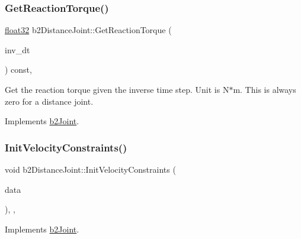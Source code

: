 \subsubsection{\texorpdfstring{GetReactionTorque()}{GetReactionTorque()}}
{\footnotesize\ttfamily \mbox{\hyperlink{b2_settings_8h_aacdc525d6f7bddb3ae95d5c311bd06a1}{float32}} b2\+Distance\+Joint\+::\+Get\+Reaction\+Torque (\begin{DoxyParamCaption}\item[{\mbox{\hyperlink{b2_settings_8h_aacdc525d6f7bddb3ae95d5c311bd06a1}{float32}}}]{inv\+\_\+dt }\end{DoxyParamCaption}) const\hspace{0.3cm}{\ttfamily [override]}, {\ttfamily [virtual]}}

Get the reaction torque given the inverse time step. Unit is N$\ast$m. This is always zero for a distance joint. 

Implements \mbox{\hyperlink{classb2_joint_ae355e441c2aa842777dc04e24f15ced0}{b2\+Joint}}.

\mbox{\label{classb2_distance_joint_abe956dd5951651b36321098416ad99fd}} 
\subsubsection{\texorpdfstring{InitVelocityConstraints()}{InitVelocityConstraints()}}
{\footnotesize\ttfamily void b2\+Distance\+Joint\+::\+Init\+Velocity\+Constraints (\begin{DoxyParamCaption}\item[{const \mbox{\hyperlink{structb2_solver_data}{b2\+Solver\+Data}} \&}]{data }\end{DoxyParamCaption})\hspace{0.3cm}{\ttfamily [override]}, {\ttfamily [protected]}, {\ttfamily [virtual]}}



Implements \mbox{\hyperlink{classb2_joint_a599c013de5514e02684b958b31dd76a4}{b2\+Joint}}.

\mbox{\label{classb2_distance_joint_a58da61301a1f1398a715107b76649923}} 
